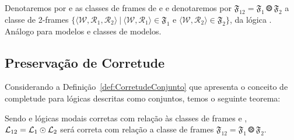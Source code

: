 
        Denotaremos por  e  as classes de frames de  e  e denotaremos por
        \(\mathfrak{F}_{12} = \mathfrak{F}_1 \Otimes \mathfrak{F}_2\) a classe de 2-frames \(\{\langle \mathcal{W}, \mathcal{R}_1, \mathcal{R}_2 \rangle \ | \
        \langle \mathcal{W}, \mathcal{R}_1 \rangle \in \mathfrak{F}_1 \text{ e } \langle \mathcal{W}, \mathcal{R}_2 \rangle \in \mathfrak{F}_2\}\),
        da lógica \Mathcali{L}{12}. Análogo para modelos e classes de modelos.

        \subsection{Preservação de Corretude}
            \label{subsec:PreservacaoCorretude}



            Considerando a Definição~\ref{def:CorretudeConjunto} que apresenta o conceito de completude para lógicas descritas como conjuntos, temos o seguinte
            teorema:

            \begin{teorema}
                \label{teo:TransCorretude}
                Sendo  e  lógicas modais corretas com relação às classes de frames  e ,
                \(\mathcal{L}_{12} = \mathcal{L}_{1} \mathbin{\odot} \mathcal{L}_{2}\) será correta com relação a classe de frames \(\mathfrak{F}_{12} = \mathfrak{F}_1 \Otimes \mathfrak{F}_2\).
            \end{teorema}

